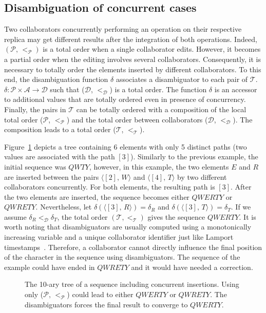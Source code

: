 \subsection{Disambiguation of concurrent cases}

Two collaborators concurrently performing an operation on their respective
replica may get different results after the integration of both
operations. Indeed, $(\mathcal{P},\,<_\mathcal{P})$ is a total order when a
single collaborator edits. However, it becomes a partial order when the editing
involves several collaborators. Consequently, it is necessary to totally order
the elements inserted by different collaborators. To this end, the
disambiguation function $\delta$ associates a disambiguator to each pair of
$\mathcal{T}$. $\delta: \mathcal{P}\times\mathcal{A} \rightarrow \mathcal{D}$
such that ($\mathcal{D}$, $<_{\mathcal{D}}$) is a total order. The function
$\delta$ is an accessor to additional values that are totally ordered even in
presence of concurrency. Finally, the pairs in $\mathcal{T}$ can be totally
ordered with a composition of the local total order ($\mathcal{P}$,
$<_{\mathcal{P}}$) and the total order between collaborators ($\mathcal{D}$,
$<_{\mathcal{D}}$). The composition leads to a total order ($\mathcal{T}$,
$<_{\mathcal{T}}$).

Figure~\ref{fig:desexample} depicts a tree containing 6 elements with only 5
distinct paths (two values are associated with the path $[3]$). Similarly to
the previous example, the initial sequence was $QWTY$, however, in this
example, the two elements $E$ and $R$ are inserted between the pairs
$\langle [2],\, W\rangle$ and $\langle [4],\,T\rangle$ by two different
collaborators concurrently. For both elements, the resulting path is
$[3]$. After the two elements are inserted, the sequence becomes either
$QWERTY$ or $QWRETY$. Nevertheless, let
$\delta(\langle [3],\, R \rangle) = \delta_R$ and
$\delta(\langle [3],\, T\rangle) = \delta_T$. If we assume
$\delta_R <_\mathcal{D} \delta_T$, the total order
$(\mathcal{T}, <_\mathcal{T})$ gives the sequence $QWERTY$. It is worth noting
that disambiguators are usually computed using a monotonically increasing
variable and a unique collaborator identifier just like Lamport
timestamps~\cite{lamport1978time}. Therefore, a collaborator cannot directly
influence the final position of the character in the sequence using
disambiguators. The sequence of the example could have ended in $QWRETY$ and it
would have needed a correction.

\begin{figure}
  \centering
  
  \caption{\label{fig:desexample}The 10-ary tree of a sequence including
    concurrent insertions. Using only ($\mathcal{P},\, <_\mathcal{P}$) could
    lead to either $QWERTY$ or $QWRETY$. The disambiguators forces the final
    result to converge to $QWERTY$.}
\end{figure}

